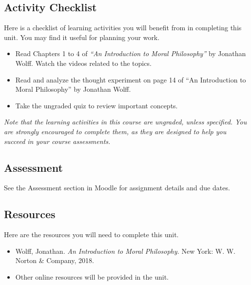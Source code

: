 \documentclass[
]{book}
\providecommand{\tightlist}{%
  \setlength{\itemsep}{0pt}\setlength{\parskip}{0pt}}
\begin{document}
\hypertarget{activity-checklist}{%
\subsection*{Activity Checklist}\label{activity-checklist}}

Here is a checklist of learning activities you will benefit from in completing this unit. You may find it useful for planning your work.

\begin{itemize}
\tightlist
\item
  Read Chapters 1 to 4 of \emph{``An Introduction to Moral Philosophy''} by Jonathan Wolff. Watch the videos related to the topics.
\item
  Read and analyze the thought experiment on page 14 of ``An Introduction to Moral Philosophy'' by Jonathan Wolff.
\item
  Take the ungraded quiz to review important concepts.
\end{itemize}

\emph{Note that the learning activities in this course are ungraded, unless specified. You are strongly encouraged to complete them, as they are designed to help you succeed in your course assessments.}

\hypertarget{assessment}{%
\subsection*{Assessment}\label{assessment}}

See the Assessment section in Moodle for assignment details and due dates.

\hypertarget{resources}{%
\subsection*{Resources}\label{resources}}

Here are the resources you will need to complete this unit.

\begin{itemize}
\item
  Wolff, Jonathan. \emph{An Introduction to Moral Philosophy.} New York: W. W. Norton \& Company, 2018.
\item
  Other online resources will be provided in the unit.
\end{itemize}
\end{document}
